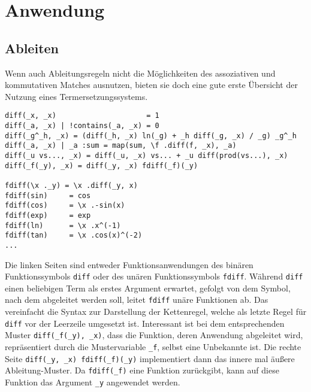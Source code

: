 \section{Anwendung} \label{subsecCppAnwendung}

\subsection{Ableiten} \label{subsubsecDiff}

Wenn auch Ableitungsregeln nicht die Möglichkeiten des assoziativen und kommutativen Matches ausnutzen, bieten sie doch eine gute erste Übersicht der Nutzung eines Termersetzungssystems.

\begin{unbreakable}\begin{verbatim}
diff(_x, _x)                     = 1
diff(_a, _x) | !contains(_a, _x) = 0
diff(_g^_h, _x) = (diff(_h, _x) ln(_g) + _h diff(_g, _x) / _g) _g^_h
diff(_a, _x) | _a :sum = map(sum, \f .diff(f, _x), _a)
diff(_u vs..., _x) = diff(_u, _x) vs... + _u diff(prod(vs...), _x)
diff(_f(_y), _x) = diff(_y, _x) fdiff(_f)(_y)

fdiff(\x ._y) = \x .diff(_y, x)
fdiff(sin)     = cos
fdiff(cos)     = \x .-sin(x)
fdiff(exp)     = exp
fdiff(ln)      = \x .x^(-1)
fdiff(tan)     = \x .cos(x)^(-2)
...
\end{verbatim}\end{unbreakable}

Die linken Seiten sind entweder Funktionsanwendungen des binären Funktionssymbols \verb|diff| oder des unären Funktionssymbols \verb|fdiff|. Während \verb|diff| einen beliebigen Term als erstes Argument erwartet, gefolgt von dem Symbol, nach dem abgeleitet werden soll, leitet \verb|fdiff| unäre Funktionen ab. Das vereinfacht die Syntax zur Darstellung der Kettenregel, welche als letzte Regel für \verb|diff|  vor der Leerzeile umgesetzt ist. Interessant ist bei dem entsprechenden Muster \verb|diff(_f(_y), _x)|, dass die Funktion, deren Anwendung abgeleitet wird, repräsentiert durch die Mustervariable \verb|_f|, selbst eine Unbekannte ist. Die rechte Seite \verb|diff(_y, _x) fdiff(_f)(_y)| implementiert dann das \glqq innere mal äußere Ableitung\grqq{}-Muster. Da \verb|fdiff(_f)| eine Funktion zurückgibt, kann auf diese Funktion das Argument \verb|_y| angewendet werden.

